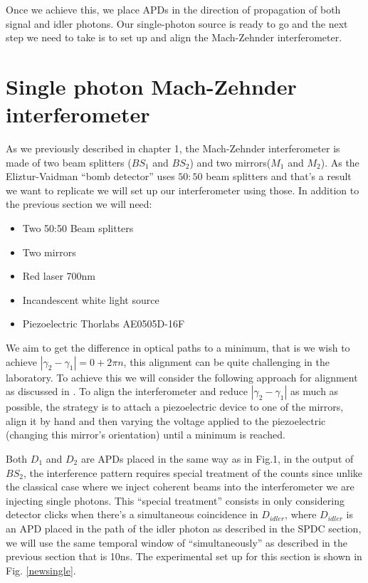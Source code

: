\documentclass{book}
\begin{document}
Once we achieve this, we place APDs in the direction of propagation of both signal and idler photons. Our single-photon source is ready to go and the next step we need to take is to set up and align the Mach-Zehnder interferometer.

\section{Single photon Mach-Zehnder interferometer}

As we previously described in chapter 1, the Mach-Zehnder interferometer is made of two beam splitters ($BS_{1}$ and $BS_{2}$) and two mirrors($M_{1}$ and $M_{2}$). As the Eliztur-Vaidman ``bomb detector'' uses $50:50$ beam splitters and that's a result we want to replicate we will set up our interferometer using those. In addition to the previous section we will need:

\begin{itemize}
\item Two 50:50 Beam splitters
\item Two mirrors
\item Red laser 700nm
\item Incandescent white light source
\item Piezoelectric Thorlabs AE0505D-16F
\end{itemize}

We aim to get the difference in optical paths to a minimum, that is we wish to achieve $|\gamma_{2}-\gamma_{1}|=0+2\pi n$, this alignment can be quite challenging in the laboratory. To achieve this we will consider the following approach for alignment as discussed in \cite{zuri}. To align the interferometer and reduce $|\gamma_{2}-\gamma_{1}|$ as much as possible, the strategy is to attach a piezoelectric device to one of the mirrors, align it by hand and then varying the voltage applied to the piezoelectric (changing this mirror's orientation) until a minimum is reached.

Both $D_{1}$ and $D_{2}$ are APDs placed in the same way as in Fig.1, in the output of  $BS_{2}$, the interference pattern requires special treatment of the counts since unlike the classical case where we inject coherent beams into the interferometer we are injecting single photons. This ``special treatment'' consists in only considering detector clicks when there's a simultaneous coincidence in $D_{idler}$, where $D_{idler}$ is an APD placed in the path of the idler photon as described in the SPDC section, we will use the same temporal window of ``simultaneously'' as described in the previous section that is 10ns. The experimental set up for this section is shown in Fig. \ref{newsingle}.
\end{document}

